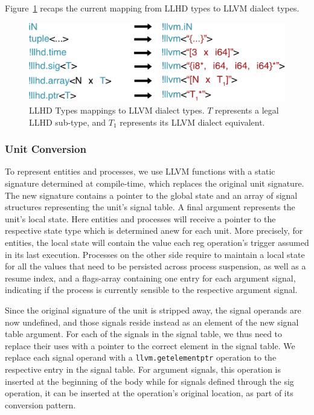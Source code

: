 Figure~\ref{fig:types_mapping} recaps the current mapping from LLHD types to LLVM dialect types.

\begin{figure}[ht]
    \centering
    \includegraphics[width=\textwidth]{gfx/Types mappings.png}
    \caption[LLHD Types mappings to LLVM dialect types.]{LLHD Types mappings to LLVM dialect types. $T$ represents a legal LLHD sub-type, and $T_1$ represents its LLVM dialect equivalent.}
    \label{fig:types_mapping}
\end{figure}


\subsubsection{Unit Conversion}
To represent entities and processes, we use LLVM functions with a static signature determined at compile-time, which replaces the original unit signature. The new signature contains a pointer to the global state and an array of signal structures representing the unit's signal table. A final argument represents the unit's local state. Here entities and processes will receive a pointer to the respective state type which is determined anew for each unit. More precisely, for entities, the local state will contain the value each reg operation's trigger assumed in its last execution. Processes on the other side require to maintain a local state for all the values that need to be persisted across process suspension, as well as a resume index, and a flags-array containing one entry for each argument signal, indicating if the process is currently sensible to the respective argument signal.

Since the original signature of the unit is stripped away, the signal operands are now undefined, and those signals reside instead as an element of the new signal table argument. For each of the signals in the signal table, we thus need to replace their uses with a pointer to the correct element in the signal table. We replace each signal operand with a \texttt{llvm.getelementptr} operation to the respective entry in the signal table. For argument signals, this operation is inserted at the beginning of the body while for signals defined through the sig operation, it can be inserted at the operation's original location, as part of its conversion pattern.

